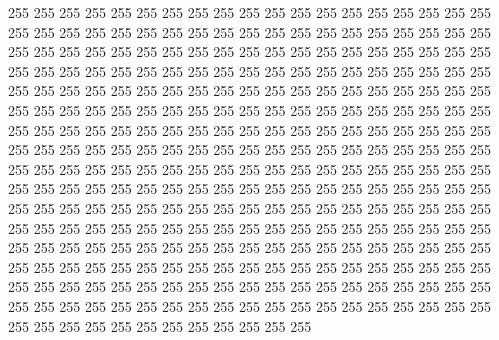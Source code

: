 255 255 255 255 255 255 255 255 255 255 255 255 255 255 255 255 255 255 255 255
255 255 255 255 255 255 255 255 255 255 255 255 255 255 255 255 255 255 255 255
255 255 255 255 255 255 255 255 255 255 255 255 255 255 255 255 255 255 255 255
255 255 255 255 255 255 255 255 255 255 255 255 255 255 255 255 255 255 255 255
255 255 255 255 255 255 255 255 255 255 255 255 255 255 255 255 255 255 255 255
255 255 255 255 255 255 255 255 255 255 255 255 255 255 255 255 255 255 255 255
255 255 255 255 255 255 255 255 255 255 255 255 255 255 255 255 255 255 255 255
255 255 255 255 255 255 255 255 255 255 255 255 255 255 255 255 255 255 255 255
255 255 255 255 255 255 255 255 255 255 255 255 255 255 255 255 255 255 255 255
255 255 255 255 255 255 255 255 255 255 255 255 255 255 255 255 255 255 255 255
255 255 255 255 255 255 255 255 255 255 255 255 255 255 255 255 255 255 255 255
255 255 255 255 255 255 255 255 255 255 255 255 255 255 255 255 255 255 255 255
255 255 255 255 255 255 255 255 255 255 255 255 255 255 255 255 255 255 255 255
255 255 255 255 255 255 255 255 255 255 255 255 255 255 255 255 255 255 255 255
255 255 255 255 255 255 255 255 255 255 255 255 255 255 255 255 255 255 255 255
255 255 255 255 255 255 255 255 255 255 255 255 255 255 255 255
